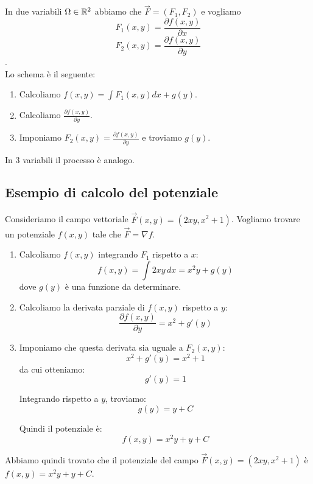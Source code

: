 In due variabili $\Omega \in \mathbb{R}^2$ abbiamo che $\vec F = (F_1, F_2)$ e vogliamo\\
$$F_1(x,y) = \frac{\partial f(x,y)}{\partial{x}} $$
$$F_2(x,y) = \frac{\partial f(x,y)}{\partial{y}} $$.\\
Lo schema è il seguente:
\begin{enumerate}
\item Calcoliamo $f(x,y) = \int F_1(x,y)dx + g(y)$.
\item Calcoliamo $\frac{\partial f(x,y)}{\partial{y}}$.
\item Imponiamo $F_2(x,y)=\frac{\partial f(x,y)}{\partial{y}}$ e troviamo $g(y)$.
\end{enumerate}

In 3 variabili il processo è analogo.\\
\subsection{Esempio di calcolo del potenziale}

Consideriamo il campo vettoriale $\vec F(x,y) = (2xy, x^2 + 1)$. Vogliamo trovare un potenziale $f(x,y)$ tale che $\vec F = \nabla f$.

\begin{enumerate}
\item Calcoliamo $f(x,y)$ integrando $F_1$ rispetto a $x$:
$$ f(x,y) = \int 2xy \, dx = x^2 y + g(y) $$
dove $g(y)$ è una funzione da determinare.

\item Calcoliamo la derivata parziale di $f(x,y)$ rispetto a $y$:
$$ \frac{\partial f(x,y)}{\partial y} = x^2 + g'(y) $$

\item Imponiamo che questa derivata sia uguale a $F_2(x,y)$:
$$ x^2 + g'(y) = x^2 + 1 $$
da cui otteniamo:
$$ g'(y) = 1 $$

Integrando rispetto a $y$, troviamo:
$$ g(y) = y + C $$

Quindi il potenziale è:
$$ f(x,y) = x^2 y + y + C $$
\end{enumerate}

Abbiamo quindi trovato che il potenziale del campo $\vec F(x,y) = (2xy, x^2 + 1)$ è $f(x,y) = x^2 y + y + C$.\\




